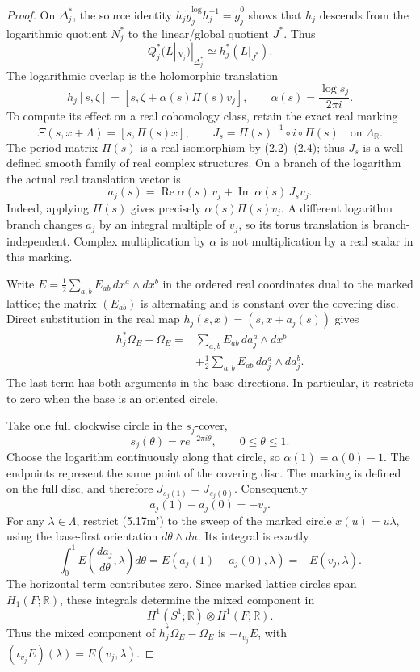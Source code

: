 \begin{proof}
On $\Delta_j^*$, the source identity
$h_j\widetilde g_j^{\log}h_j^{-1}=\widetilde g_j^0$ shows that $h_j$
descends from the logarithmic quotient $N_j^*$ to the linear/global
quotient $J^*$.  Thus
\[
 Q_j^*(L|_{N_j})|_{\Delta_j^*}
 \simeq h_j^*(L|_{J^*}).
\tag{5.17l'''}
\]
The logarithmic overlap is the holomorphic translation
\[
 h_j[s,\zeta]=[s,\zeta+\alpha(s)\Pi(s)v_j],
 \qquad \alpha(s)=\frac{\log s_j}{2\pi i}.
\]
To compute its effect on a real cohomology class, retain the exact
real marking
\[
 \Xi(s,x+\Lambda)=[s,\Pi(s)x],\qquad
 J_s=\Pi(s)^{-1}\circ i\circ\Pi(s)
 \quad\text{on }\Lambda_{\mathbb R}.
\]
The period matrix \(\Pi(s)\) is a real isomorphism by (2.2)--(2.4);
thus \(J_s\) is a well-defined smooth family of real complex
structures.  On a branch of the logarithm the actual real
translation vector is
\[
 a_j(s)=\operatorname{Re}\alpha(s)\,v_j+
        \operatorname{Im}\alpha(s)\,J_s v_j.
 \tag{5.17m}
\]
Indeed, applying \(\Pi(s)\) gives precisely
\(\alpha(s)\Pi(s)v_j\).  A different logarithm branch changes
\(a_j\) by an integral multiple of \(v_j\), so its torus translation
is branch-independent.  Complex multiplication by \(\alpha\) is
not multiplication by a real scalar in this marking.

Write \(E=\frac12\sum_{a,b}E_{ab}\,dx^a\wedge dx^b\) in the
ordered real coordinates dual to the marked lattice; the matrix
\((E_{ab})\) is alternating and is constant over the covering
disc.  Direct substitution in the real map
\(h_j(s,x)=(s,x+a_j(s))\) gives
\[
 \begin{split}
 h_j^*\Omega_E-\Omega_E
  ={}&\sum_{a,b}E_{ab}\,d a_j^a\wedge dx^b\\
    &+\frac12\sum_{a,b}E_{ab}\,d a_j^a\wedge d a_j^b.
 \end{split}
 \tag{5.17m'}
\]
The last term has both arguments in the base directions.
In particular, it restricts to zero when the base is an oriented
circle.

Take one full clockwise circle in the \(s_j\)-cover,
\[
 s_j(\theta)=r e^{-2\pi i\theta},\qquad 0\le\theta\le1.
\]
Choose the logarithm continuously along that circle, so
\(\alpha(1)=\alpha(0)-1\).  The endpoints represent the same
point of the covering disc.  The marking is defined on the full
disc, and therefore \(J_{s_j(1)}=J_{s_j(0)}\).  Consequently
\[
 a_j(1)-a_j(0)=-v_j.
 \tag{5.17m''}
\]
For any \(\lambda\in\Lambda\), restrict (5.17m') to the sweep of
the marked circle \(x(u)=u\lambda\), using the base-first
orientation \(d\theta\wedge du\).  Its integral is exactly
\[
 \int_0^1 E\!\left(\frac{d a_j}{d\theta},\lambda\right)d\theta
 =E(a_j(1)-a_j(0),\lambda)
 =-E(v_j,\lambda).
\]
The horizontal term contributes zero.  Since marked lattice
circles span \(H_1(F;\mathbb R)\), these integrals determine the
mixed component in
\[
 H^1(S^1;\mathbb R)\otimes H^1(F;\mathbb R).
\]
Thus the mixed component of \(h_j^*\Omega_E-\Omega_E\) is
\(-\iota_{v_j}E\), with \((\iota_{v_j}E)(\lambda)=E(v_j,\lambda)\).


\end{proof}
